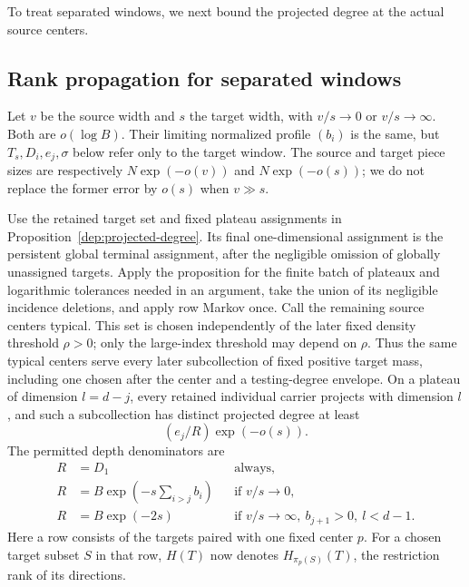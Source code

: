 To treat separated windows, we next bound the projected degree at the
actual source centers.



\subsection{Rank propagation for separated windows}

Let $v$ be the source width and $s$ the target width, with
$v/s\to0$ or $v/s\to\infty$.  Both are $o(\log B)$.
Their limiting normalized profile $(b_i)$ is the same, but
$T_s,D_i,e_j,\sigma$ below refer only to the target window.
The source and target piece sizes are respectively
$N\exp(-o(v))$ and $N\exp(-o(s))$; we do not replace the
former error by $o(s)$ when $v\gg s$.

Use the retained target set and fixed plateau assignments in
Proposition~\ref{dep:projected-degree}.  Its final one-dimensional
assignment is the persistent global terminal assignment, after the
negligible omission of globally unassigned targets.  Apply the proposition
for the finite batch of plateaux and logarithmic tolerances needed in an
argument, take the union of its negligible incidence deletions, and apply
row Markov once.  Call the remaining source centers typical.  This set is chosen independently
of the later fixed density threshold $\rho>0$; only the large-index
threshold may depend on $\rho$.  Thus the same typical centers serve
every later subcollection of fixed positive target mass, including one
chosen after the center and a testing-degree envelope.  On a plateau of
dimension $l=d-j$, every retained individual carrier projects with
dimension $l$, and such a subcollection has distinct projected degree at least
\begin{equation}\label{sc:projected-degree-interface}
 (e_j/R)\exp(-o(s)).
\end{equation}
The permitted depth denominators are
\begin{align}
 R&=D_1 &&\text{always},\label{sc:R-first}\\
 R&=B\exp\left(-s\sum_{i>j}b_i\right)
       &&\text{if }v/s\to0,\label{sc:R-narrow}\\
 R&=B\exp(-2s)
       &&\text{if }v/s\to\infty,\ b_{j+1}>0,
                           \ l<d-1.\label{sc:R-wide}
\end{align}
Here a row consists of the targets paired with one fixed center $p$.
For a chosen target subset $S$ in that row, $H(T)$ now denotes
$H_{\pi_p(S)}(T)$, the restriction rank of its directions.

